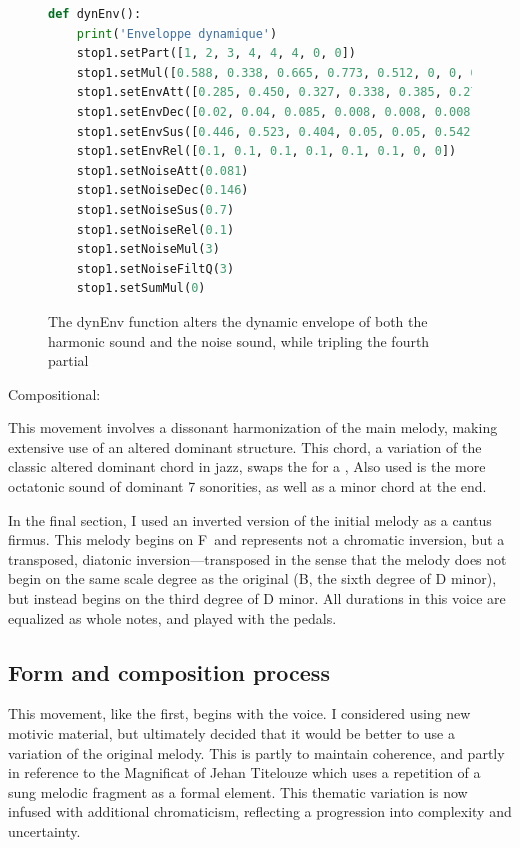 \documentclass[12pt,twoside,maitrise]{dms_ks}
\theoremstyle{definition}
\begin{document}
\begin{figure}[H]
\begin{lstlisting}[language=Python]
def dynEnv():
    print('Enveloppe dynamique')
    stop1.setPart([1, 2, 3, 4, 4, 4, 0, 0])
    stop1.setMul([0.588, 0.338, 0.665, 0.773, 0.512, 0, 0, 0])
    stop1.setEnvAtt([0.285, 0.450, 0.327, 0.338, 0.385, 0.277, 0, 0])
    stop1.setEnvDec([0.02, 0.04, 0.085, 0.008, 0.008, 0.008, 0, 0])
    stop1.setEnvSus([0.446, 0.523, 0.404, 0.05, 0.05, 0.542, 0, 0])
    stop1.setEnvRel([0.1, 0.1, 0.1, 0.1, 0.1, 0.1, 0, 0])
    stop1.setNoiseAtt(0.081)
    stop1.setNoiseDec(0.146)
    stop1.setNoiseSus(0.7)
    stop1.setNoiseRel(0.1)
    stop1.setNoiseMul(3)
    stop1.setNoiseFiltQ(3)
    stop1.setSumMul(0)
\end{lstlisting}
\caption{The dynEnv function alters the dynamic envelope of both the harmonic sound and the noise sound, while tripling the fourth partial}
\end{figure}

Compositional:

This movement involves a dissonant harmonization of the main melody, making extensive use of an altered dominant  structure.
This chord, a variation of the classic altered dominant chord in jazz, swaps the  for a , 
Also used is the more octatonic sound of dominant 7   sonorities, as well as a minor  chord at the end.

In the final section, I used an inverted version of the initial melody as a cantus firmus.
This melody begins on F\na\ and represents not a chromatic inversion, but a transposed, diatonic inversion---transposed in the sense that the melody does not begin on the same scale degree as the original (B\fl, the sixth degree of D minor), but instead begins on the third degree of D minor. 
All durations in this voice are equalized as whole notes, and played with the pedals.

\subsection{Form and composition process}

This movement, like the first, begins with the voice.
I considered using new motivic material, but ultimately decided that it would be better to use a variation of the original melody.
This is partly to maintain coherence, and partly in reference to the Magnificat of Jehan Titelouze which uses a repetition of a sung melodic fragment as a formal element.
This thematic variation is now infused with additional chromaticism, reflecting a progression into complexity and uncertainty.
\end{document}
